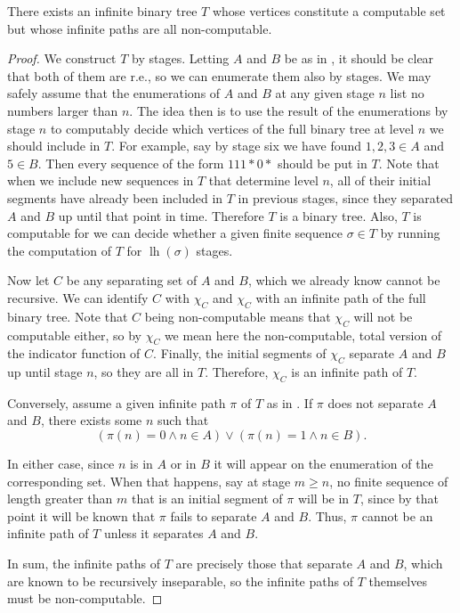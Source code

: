 \documentclass[../main.tex]{memoir}
\begin{document}
\begin{theorem}
  \label{thm:wkl-counterexample}
  There exists an infinite binary tree $T$ whose vertices constitute a computable set but whose infinite paths are all non-computable.
\end{theorem}
\begin{proof}
  We construct $T$ by stages. Letting $A$ and $B$ be as in , it should be clear that both of them are r.e., so we can enumerate them also by stages. We may safely assume that the enumerations of $A$ and $B$ at any given stage $n$ list no numbers larger than $n$. The idea then is to use the result of the enumerations by stage $n$ to computably decide which vertices of the full binary tree at level $n$ we should include in $T$. For example, say by stage six we have found $1, 2, 3 \in A$ and $5 \in B$. Then every sequence of the form $111*0*$ should be put in $T$. Note that when we include new sequences in $T$ that determine level $n$, all of their initial segments have already been included in $T$ in previous stages, since they separated $A$ and $B$ up until that point in time. Therefore $T$ is a binary tree. Also, $T$ is computable for we can decide whether a given finite sequence $\sigma \in T$ by running the computation of $T$ for $\operatorname{lh}(\sigma)$ stages.

  Now let $C$ be any separating set of $A$ and $B$, which we already know cannot be recursive. We can identify $C$ with $\chi_C$ and $\chi_C$ with an infinite path of the full binary tree. Note that $C$ being non-computable means that $\chi_C$ will not be computable either, so by $\chi_C$ we mean here the non-computable, total version of the indicator function of $C$. Finally, the initial segments of $\chi_C$ separate $A$ and $B$ up until stage $n$, so they are all in $T$. Therefore, $\chi_C$ is an infinite path of $T$.

  Conversely, assume a given infinite path $\pi$ of $T$ as in . If $\pi$ does not separate $A$ and $B$, there exists some $n$ such that
  \[ (\pi(n) = 0 \land n \in A) \lor (\pi(n) = 1 \land n \in B). \]

  In either case, since $n$ is in $A$ or in $B$ it will appear on the enumeration of the corresponding set. When that happens, say at stage $m \ge n$, no finite sequence of length greater than $m$ that is an initial segment of $\pi$ will be in $T$, since by that point it will be known that $\pi$ fails to separate $A$ and $B$. Thus, $\pi$ cannot be an infinite path of $T$ unless it separates $A$ and $B$.

  In sum, the infinite paths of $T$ are precisely those that separate $A$ and $B$, which are known to be recursively inseparable, so the infinite paths of $T$ themselves must be non-computable.
\end{proof}
\end{document}
